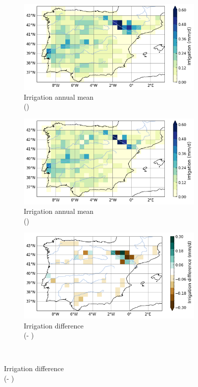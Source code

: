 \begin{figure}[htbp]
    \centering
    \begin{subfigure}[b]{0.32\textwidth}
        \caption{Irrigation annual mean\\(\std)}
        \includegraphics[width=\linewidth]{images/chap3/maps/irrigation_subgrid.png}
    \end{subfigure}
    \begin{subfigure}[b]{0.32\textwidth}
        \caption{Irrigation annual mean\\(\native)}
        \includegraphics[width=\linewidth]{images/chap3/maps/irrigation_interp.png}
    \end{subfigure}
    \begin{subfigure}[b]{0.32\textwidth}
        \caption{Irrigation difference\\(\native - \std)}
        \includegraphics[width=\linewidth]{images/chap3/maps/irrigation_diff.png}
    \end{subfigure} \\


\end{figure}
